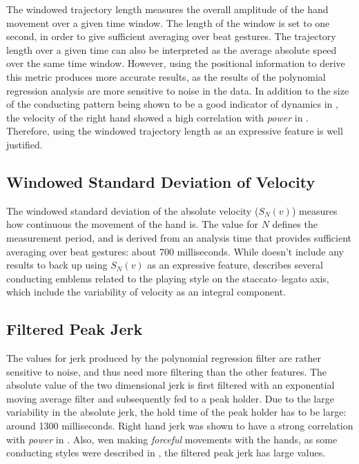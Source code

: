 The windowed trajectory length measures
the overall amplitude of the hand movement over a
given time window.
The length of the window is set to one second,
in order to give sufficient averaging
over beat gestures.
The trajectory length over a given time
can also be interpreted as the average absolute speed
over the same time window.
However, using the positional information
to derive this metric produces more accurate results,
as the results of the polynomial regression analysis
are more sensitive to noise in the data.
In addition to the size of the conducting pattern
being shown to be a good indicator of dynamics in \cite{sousa1988},
the velocity of the right hand showed a
high correlation with \textit{power}
in \cite{luck2010}.
Therefore, using the windowed trajectory length
as an expressive feature is well justified.

\subsection*{Windowed Standard Deviation of Velocity}

The windowed standard deviation of the absolute velocity ($S_N(v)$)
measures how continuous the movement of the hand is.
The value for $N$ defines the measurement period,
and is derived from an analysis time
that provides sufficient averaging over beat gestures:
about 700 milliseconds.
While \cite{luck2010} doesn't include any results
to back up using $S_N(v)$ as an expressive feature,
\cite{sousa1988} describes several conducting emblems
related to the playing style on the staccato--legato axis,
which include the variability of velocity as an integral component.

\subsection*{Filtered Peak Jerk}

The values for jerk produced by
the polynomial regression filter
are rather sensitive to noise,
and thus need more filtering than the other features.
The absolute value of the two dimensional jerk
is first filtered with an
exponential moving average filter
and subsequently fed to a peak holder.
Due to the large variability in the absolute jerk,
the hold time of the peak holder has to be large:
around 1300 milliseconds.
Right hand jerk was shown to have a
strong correlation with \textit{power} in \cite{luck2010}.
Also, wen making \textit{forceful} movements with the hands,
as some conducting styles were described in \cite{sousa1988},
the filtered peak jerk has large values.

